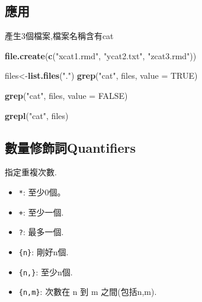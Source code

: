 \documentclass[]{book}
\newenvironment{Shaded}{\begin{snugshade}}{\end{snugshade}}
\newcommand{\DataTypeTok}[1]{\textcolor[rgb]{0.13,0.29,0.53}{#1}}
\newcommand{\KeywordTok}[1]{\textcolor[rgb]{0.13,0.29,0.53}{\textbf{#1}}}
\newcommand{\NormalTok}[1]{#1}
\newcommand{\OtherTok}[1]{\textcolor[rgb]{0.56,0.35,0.01}{#1}}
\newcommand{\StringTok}[1]{\textcolor[rgb]{0.31,0.60,0.02}{#1}}
\providecommand{\tightlist}{%
  \setlength{\itemsep}{0pt}\setlength{\parskip}{0pt}}
\theoremstyle{definition}
\theoremstyle{definition}
\theoremstyle{definition}
\theoremstyle{remark}
\begin{document}
\subsection{應用}

產生3個檔案,檔案名稱含有cat

\begin{Shaded}
\begin{Highlighting}[]
\KeywordTok{file.create}\NormalTok{(}\KeywordTok{c}\NormalTok{(}\StringTok{"xcat1.rmd"}\NormalTok{, }\StringTok{"ycat2.txt"}\NormalTok{, }\StringTok{"zcat3.rmd"}\NormalTok{))}
\end{Highlighting}
\end{Shaded}

\begin{Shaded}
\begin{Highlighting}[]
\NormalTok{files<-}\KeywordTok{list.files}\NormalTok{(}\StringTok{"."}\NormalTok{)}
\KeywordTok{grep}\NormalTok{(}\StringTok{"cat"}\NormalTok{, files, }\DataTypeTok{value =} \OtherTok{TRUE}\NormalTok{)}
\end{Highlighting}
\end{Shaded}

\begin{Shaded}
\begin{Highlighting}[]
\KeywordTok{grep}\NormalTok{(}\StringTok{"cat"}\NormalTok{, files, }\DataTypeTok{value =} \OtherTok{FALSE}\NormalTok{)}
\end{Highlighting}
\end{Shaded}

\begin{Shaded}
\begin{Highlighting}[]
\KeywordTok{grepl}\NormalTok{(}\StringTok{"cat"}\NormalTok{, files)}
\end{Highlighting}
\end{Shaded}

\hypertarget{quantifiers}{%
\subsection{數量修飾詞Quantifiers}\label{quantifiers}}

指定重複次數.

\begin{itemize}
\tightlist
\item
  \texttt{*}: 至少0個。\\
\item
  \texttt{+}: 至少一個.\\
\item
  \texttt{?}: 最多一個.\\
\item
  \texttt{\{n\}}: 剛好n個.\\
\item
  \texttt{\{n,\}}: 至少n個.\\
\item
  \texttt{\{n,m\}}: 次數在 n 到 m 之間(包括n,m).
\end{itemize}
\end{document}
